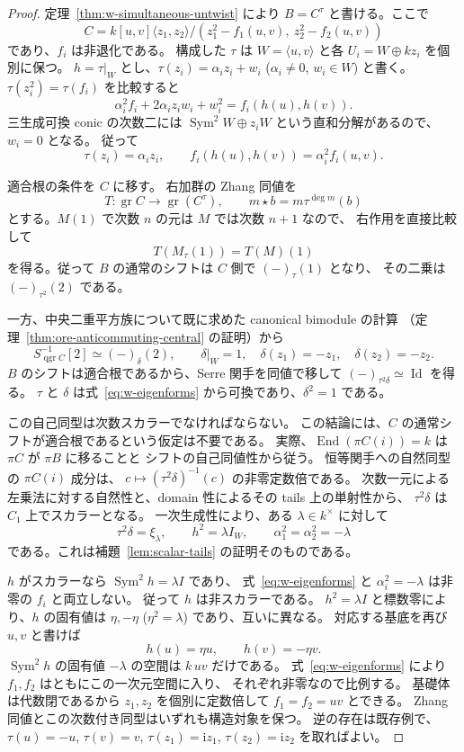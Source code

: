 \begin{proof}
定理~\ref{thm:w-simultaneous-untwist} により $B=C^\tau$ と書ける。ここで
\[
 C=k[u,v]\langle z_1,z_2\rangle/
 (z_1^2-f_1(u,v),\ z_2^2-f_2(u,v))
\]
であり、$f_i$ は非退化である。
構成した $\tau$ は $W=\langle u,v\rangle$ と各
$U_i=W\oplus kz_i$ を個別に保つ。
$h=\tau|_W$ とし、$\tau(z_i)=\alpha_i z_i+w_i$
($\alpha_i\ne0$, $w_i\in W$) と書く。
$\tau(z_i^2)=\tau(f_i)$ を比較すると
\[
 \alpha_i^2 f_i+2\alpha_i z_iw_i+w_i^2=f_i(h(u),h(v)).
\]
三生成可換 conic の次数二には
$\operatorname{Sym}^2W\oplus z_iW$ という直和分解があるので、$w_i=0$ となる。
従って
\begin{equation}
 \tau(z_i)=\alpha_i z_i,\qquad
 f_i(h(u),h(v))=\alpha_i^2f_i(u,v).
 \label{eq:w-eigenforms}
\end{equation}

適合根の条件を $C$ に移す。
右加群の Zhang 同値を
\[
 T:\operatorname{gr}C\longrightarrow\operatorname{gr}(C^\tau),\qquad
 m\star b=m\tau^{\deg m}(b)
\]
とする。$M(1)$ で次数 $n$ の元は $M$ では次数 $n+1$ なので、
右作用を直接比較して
\[
 T(M_\tau(1))=T(M)(1)
\]
を得る。従って $B$ の通常のシフトは $C$ 側で $(-)_\tau(1)$ となり、
その二乗は $(-)_{\tau^2}(2)$ である。

一方、中央二重平方族について既に求めた canonical bimodule の計算
（定理~\ref{thm:ore-anticommuting-central} の証明）から
\[
 S^{-1}_{\operatorname{qgr}C}[2]\simeq(-)_\delta(2),\qquad
 \delta|_W=1,\quad\delta(z_1)=-z_1,\quad\delta(z_2)=-z_2.
\]
$B$ のシフトは適合根であるから、Serre 関手を同値で移して
$(-)_{\tau^2\delta}\simeq\operatorname{Id}$ を得る。
$\tau$ と $\delta$ は式~\eqref{eq:w-eigenforms} から可換であり、$\delta^2=1$ である。

この自己同型は次数スカラーでなければならない。
この結論には、$C$ の通常シフトが適合根であるという仮定は不要である。
実際、$\operatorname{End}(\pi C(i))=k$ は $\pi C$ が $\pi B$ に移ることと
シフトの自己同値性から従う。
恒等関手への自然同型の $\pi C(i)$ 成分は、
$c\mapsto(\tau^2\delta)^{-1}(c)$ の非零定数倍である。
次数一元による左乗法に対する自然性と、domain 性によるその tails 上の単射性から、
$\tau^2\delta$ は $C_1$ 上でスカラーとなる。
一次生成性により、ある $\lambda\in k^\times$ に対して
\[
 \tau^2\delta=\xi_\lambda,
 \qquad h^2=\lambda I_W,
 \qquad \alpha_1^2=\alpha_2^2=-\lambda
\]
である。これは補題~\ref{lem:scalar-tails} の証明そのものである。

$h$ がスカラーなら $\operatorname{Sym}^2h=\lambda I$ であり、
式~\eqref{eq:w-eigenforms} と $\alpha_i^2=-\lambda$ は非零の $f_i$ と両立しない。
従って $h$ は非スカラーである。
$h^2=\lambda I$ と標数零により、$h$ の固有値は $\eta,-\eta$
($\eta^2=\lambda$) であり、互いに異なる。
対応する基底を再び $u,v$ と書けば
\[
 h(u)=\eta u,\qquad h(v)=-\eta v.
\]
$\operatorname{Sym}^2h$ の固有値 $-\lambda$ の空間は $k\,uv$ だけである。
式~\eqref{eq:w-eigenforms} により $f_1,f_2$ はともにこの一次元空間に入り、
それぞれ非零なので比例する。
基礎体は代数閉であるから $z_1,z_2$ を個別に定数倍して
$f_1=f_2=uv$ とできる。
Zhang 同値とこの次数付き同型はいずれも構造対象を保つ。
逆の存在は既存例で、$\tau(u)=-u$, $\tau(v)=v$,
$\tau(z_1)=\mathrm i z_1$, $\tau(z_2)=\mathrm i z_2$ を取ればよい。
\end{proof}

